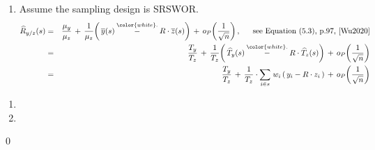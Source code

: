\begin{lemma}
\begin{enumerate}
\begin{eqnarray*}
    \Var\!\left(\,\widehat{R}_{y/z}\,\right)
    & \approx &
        \dfrac{1}{\widehat{T}_{z}^{2}}\cdot\left(\,
            1 - \dfrac{n}{N}
            \,\right)
        \dfrac{1}{n}
        \left(\,
            \widehat{\Var}(\widehat{T}_{y})
            \,+\,
            \widehat{R}_{y/z}^{2}\cdot\widehat{\Var}(\widehat{T}_{z})
            \,-\,
            2\cdot\widehat{R}_{y/z}\cdot\widehat{\Cov}(\widehat{T}_{y},\widehat{T}_{z})
            \,\right)
    \end{eqnarray*}
\item
    Assume the sampling design is SRSWOR.
    \begin{eqnarray*}
    \widehat{R}_{y/z}(s)
    & = &
        \dfrac{\mu_{y}}{\mu_{z}}
        \,+\,
        \dfrac{1}{\mu_{z}}\!\left(\,
            \overline{y}(s)
            \overset{{\color{white}.}}{-}
            R\cdot\overline{z}(s)
            \right)
        \,+\,
        o_{P}\!\left(\dfrac{1}{\sqrt{n}}\right),
    \quad\;\;
    \textnormal{see Equation (5.3), p.97, \cite{Wu2020}}
    \\
    & = &
        \dfrac{T_{y}}{T_{z}}
        \,+\,
        \dfrac{1}{T_{z}}\!\left(\,
            \widehat{T}_{y}(s)
            \overset{{\color{white}.}}{-}
            R\cdot\widehat{T}_{z}(s)
            \right)
        \,+\,
        o_{P}\!\left(\dfrac{1}{\sqrt{n}}\right)
    \\
    & = &
        \dfrac{T_{y}}{T_{z}}
        \,+\,
        \dfrac{1}{T_{z}}\cdot
        \underset{i \in s}{\sum}\;w_{i}\left(\,
            y_{i} - R \cdot z_{i}
            \,\right)
        \,+\,
        o_{P}\!\left(\dfrac{1}{\sqrt{n}}\right)
    \end{eqnarray*}
\end{enumerate}
\end{lemma}
\proof
\begin{enumerate}
\item
\item
\end{enumerate}
\qed

